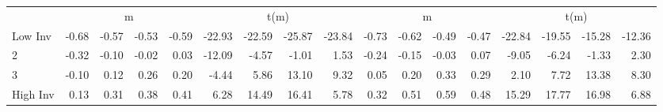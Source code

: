 \begin{table}[!ht]
\begin{tabular}{lrrrrrrrrrrrrrrrr}
  
    
      & \multicolumn{4}{c}{m} & \multicolumn{4}{c}{t(m)}
    
      & \multicolumn{4}{c}{m} & \multicolumn{4}{c}{t(m)}
    
    \\
      \cmidrule(r){2-5} \cmidrule(r){6-9} \cmidrule(r){10-13} \cmidrule(r){14-17}

    Low Inv   & -0.68  & -0.57  & -0.53  & -0.59  & -22.93  & -22.59  & -25.87  & -23.84  & -0.73  & -0.62  & -0.49  & -0.47  & -22.84  & -19.55  & -15.28  & -12.36  \\
           2  & -0.32  & -0.10  & -0.02  & 0.03  & -12.09  & -4.57  & -1.01  & 1.53  & -0.24  & -0.15  & -0.03  & 0.07  & -9.05  & -6.24  & -1.33  & 2.30  \\
           3  & -0.10  & 0.12  & 0.26  & 0.20  & -4.44  & 5.86  & 13.10  & 9.32  & 0.05  & 0.20  & 0.33  & 0.29  & 2.10  & 7.72  & 13.38  & 8.30  \\
    High Inv  & 0.13  & 0.31  & 0.38  & 0.41  & 6.28  & 14.49  & 16.41  & 5.78  & 0.32  & 0.51  & 0.59  & 0.48  & 15.29  & 17.77  & 16.98  & 6.88  \\

  

  \bottomrule
\end{tabular}
\label{tbl:32_Size_BM_Prior_C1997b}
\end{table}